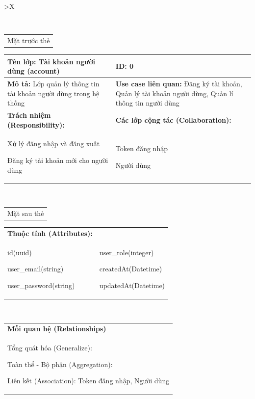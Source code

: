 \begin{xltabular}{\textwidth}{
		>{\centering\arraybackslash}X
	}
	\caption{\bfseries \fontsize{12pt}{0pt}\selectfont Thẻ CRC lớp Tài khoản người dùng}
	\\
	\begin{tabularx}{0.9\textwidth}{X}
		Mặt trước thẻ
	\end{tabularx}
	\begin{tabularx}{0.9\textwidth}{|X|X|}
		\hline
		\textbf{Tên lớp:} Tài khoản người dùng (account)                          & \textbf{ID:} 0                                                                                              \\
		\hline
		\textbf{Mô tả:} Lớp quản lý thông tin tài khoản người dùng trong hệ thống & \textbf{Use case liên quan:}  Đăng ký tài khoản, Quản lý tài khoản người dùng, Quản lí thông tin người dùng \\
		\hline
		\textbf{Trách nhiệm (Responsibility):}                                    & \textbf{Các lớp cộng tác (Collaboration):}                                                                  \\
		Xử lý đăng nhập và đăng xuất

		Đăng ký tài khoản mới cho người dùng
		                                                                          &
		Token đăng nhập

		Người dùng
		\\
		\hline
	\end{tabularx}
	\\
	\begin{tabularx}{0.9\textwidth}{X}
		Mặt sau thẻ
	\end{tabularx}
	\begin{tabularx}{0.9\textwidth}{|X|X|}
		\hline
		\textbf{Thuộc tính (Attributes):} & \\
		id(uuid)

		user\_email(string)

		user\_password(string)
		                                  &
		user\_role(integer)

		createdAt(Datetime)

		updatedAt(Datetime)
		\\ \hline
	\end{tabularx}
	\\
	\begin{tabularx}{0.9\textwidth}{|X|}
		\hline
		\textbf{Mối quan hệ (Relationships)} \\
		Tổng quát hóa (Generalize):

		Toàn thể - Bộ phận (Aggregation):

		Liên kết (Association): Token đăng nhập, Người dùng
		\\
		\hline
	\end{tabularx}
\end{xltabular}


